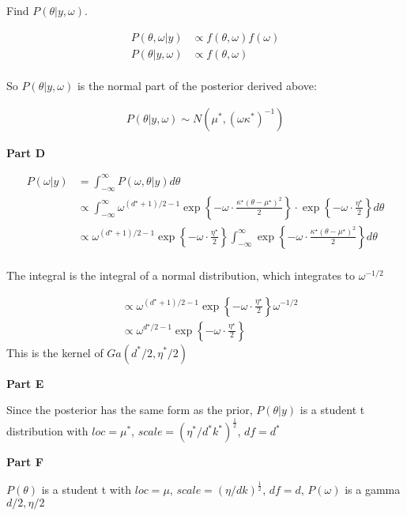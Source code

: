 \documentclass[12pt]{amsart}
\begin{document}
Find $P(\theta|y, \omega)$. 


\begin{align*}
    P(\theta, \omega|y) & \propto f(\theta, \omega)f(\omega)\\
  P(\theta|y, \omega)   & \propto f(\theta, \omega)
\end{align*}\\

So $P(\theta|y, \omega)$ is the normal part of the posterior derived above:

\begin{align*}
    P(\theta|y, \omega) \sim N(\mu^*, (\omega \kappa^*)^{-1})
\end{align*}

\bigskip

{\bf Part D} 
\bigskip

\begin{align*}
    P(\omega|y) &= \int_{-\infty}^{\infty}P(\omega, \theta|y)d\theta\\
    &\propto \int_{-\infty}^{\infty}\omega^{(d^\star+1)/2 - 1} \exp \left\{ - \omega \cdot \frac{\kappa^\star (\theta - \mu^\star)^2}{2}  \right\}
\cdot \exp\left\{ -  \omega \cdot \frac{\eta^\star}{2}  \right\}d\theta \\
&\propto \omega^{(d^\star+1)/2 - 1} \exp\left\{ -  \omega \cdot \frac{\eta^\star}{2}  \right\} \int_{-\infty}^{\infty} \exp \left\{ - \omega \cdot \frac{\kappa^\star (\theta - \mu^\star)^2}{2}  \right\}d\theta\\
\end{align*}

The integral is the integral of a normal distribution, which integrates to $\omega^{-1/2}$

\begin{align*}
    & \propto \omega^{(d^\star+1)/2 - 1} \exp\left\{ -  \omega \cdot \frac{\eta^\star}{2}  \right\} \omega^{-1/2} \\
     & \propto \omega^{d^\star/2- 1} \exp\left\{ -  \omega \cdot \frac{\eta^\star}{2}  \right\}
\end{align*}
This is the kernel of $Ga(d^*/2, \eta^*/2)$

\bigskip
\bigskip
{\bf Part E} 
\bigskip

Since the posterior has the same form as the prior, $P(\theta|y)$ is a student t distribution with $loc=\mu^*$, $scale=(\eta^*/d^*k^*)^\frac{1}{2}$, $df=d^*$

\bigskip
\bigskip
{\bf Part F} 
\bigskip

$P(\theta)$ is a  student t with $loc=\mu$, $scale=(\eta/dk)^\frac{1}{2}$, $df=d$, $P(\omega)$ is a gamma $d/2,\eta/2$
\end{document}
